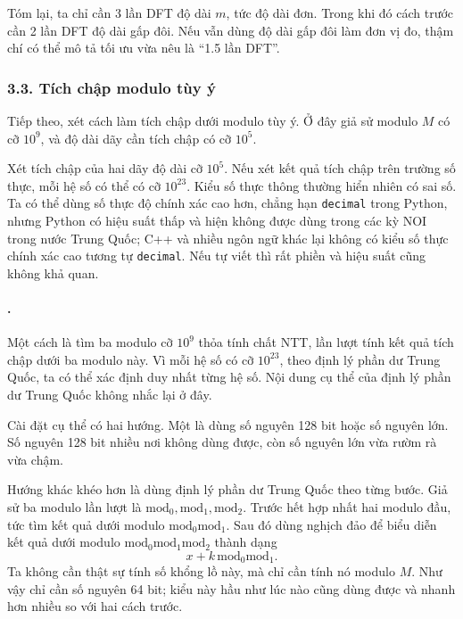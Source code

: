 \documentclass[11pt]{article}
\begin{document}
Tóm lại, ta chỉ cần 3 lần DFT độ dài \(m\), tức độ dài đơn. Trong khi đó cách
trước cần 2 lần DFT độ dài gấp đôi. Nếu vẫn dùng độ dài gấp đôi làm đơn vị đo,
thậm chí có thể mô tả tối ưu vừa nêu là ``1.5 lần DFT''.

\subsubsection*{3.3. Tích chập modulo tùy ý}

Tiếp theo, xét cách làm tích chập dưới modulo tùy ý. Ở đây giả sử modulo
\(M\) có cỡ \(10^9\), và độ dài dãy cần tích chập có cỡ \(10^5\).

Xét tích chập của hai dãy độ dài cỡ \(10^5\). Nếu xét kết quả tích chập trên
trường số thực, mỗi hệ số có thể có cỡ \(10^{23}\). Kiểu số thực thông thường
hiển nhiên có sai số. Ta có thể dùng số thực độ chính xác cao hơn, chẳng hạn
\texttt{decimal} trong Python, nhưng Python có hiệu suất thấp và hiện không
được dùng trong các kỳ NOI trong nước Trung Quốc; C++ và nhiều ngôn ngữ khác
lại không có kiểu số thực chính xác cao tương tự \texttt{decimal}. Nếu tự viết
thì rất phiền và hiệu suất cũng không khả quan.

\paragraph{.}
Một cách là tìm ba modulo cỡ \(10^9\) thỏa tính chất NTT, lần lượt tính kết
quả tích chập dưới ba modulo này. Vì mỗi hệ số có cỡ \(10^{23}\), theo định lý
phần dư Trung Quốc, ta có thể xác định duy nhất từng hệ số. Nội dung cụ thể
của định lý phần dư Trung Quốc không nhắc lại ở đây.

Cài đặt cụ thể có hai hướng. Một là dùng số nguyên 128 bit hoặc số nguyên lớn.
Số nguyên 128 bit nhiều nơi không dùng được, còn số nguyên lớn vừa rườm rà vừa
chậm.

Hướng khác khéo hơn là dùng định lý phần dư Trung Quốc theo từng bước. Giả sử
ba modulo lần lượt là \(\mathrm{mod}_0,\mathrm{mod}_1,\mathrm{mod}_2\). Trước
hết hợp nhất hai modulo đầu, tức tìm kết quả dưới modulo
\(\mathrm{mod}_0\mathrm{mod}_1\). Sau đó dùng nghịch đảo để biểu diễn kết quả
dưới modulo \(\mathrm{mod}_0\mathrm{mod}_1\mathrm{mod}_2\) thành dạng
\[
  x+k\,\mathrm{mod}_0\mathrm{mod}_1.
\]
Ta không cần thật sự tính số khổng lồ này, mà chỉ cần tính nó modulo \(M\).
Như vậy chỉ cần số nguyên 64 bit; kiểu này hầu như lúc nào cũng dùng được và
nhanh hơn nhiều so với hai cách trước.
\end{document}
